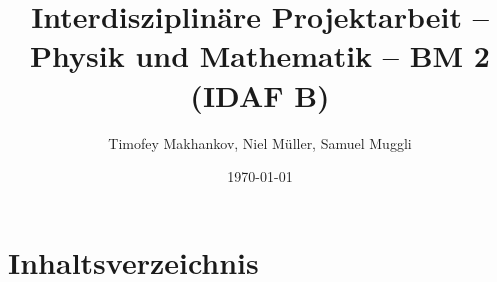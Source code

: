 \documentclass[11pt, a4paper]{article}
\title{Interdisziplinäre Projektarbeit – Physik und Mathematik – BM 2 (IDAF B)}
\author{Timofey Makhankov, Niel Müller, Samuel Muggli}
\date{\today}
\begin{document}
\maketitle


\section{Inhaltsverzeichnis}\label{sec:inhaltsverzeichnis}
\tableofcontents







\end{document}

